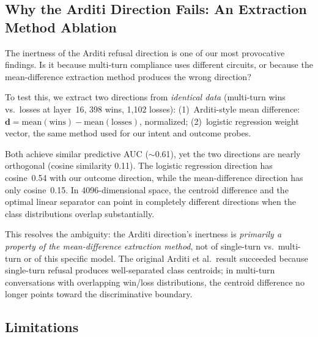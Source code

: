 \documentclass[11pt]{article}
\begin{document}
\subsection{Why the Arditi Direction Fails: An Extraction Method Ablation}
\label{sec:extraction}

The inertness of the Arditi refusal direction is one of our most provocative findings.
Is it because multi-turn compliance uses different circuits, or because the mean-difference extraction method produces the wrong direction?

To test this, we extract two directions from \emph{identical data} (multi-turn wins vs.\ losses at layer~16, 398 wins, 1{,}102 losses):
(1)~Arditi-style mean difference: $\mathbf{d} = \text{mean}(\text{wins}) - \text{mean}(\text{losses})$, normalized;
(2)~logistic regression weight vector, the same method used for our intent and outcome probes.

Both achieve similar predictive AUC ($\sim$0.61), yet the two directions are nearly orthogonal (cosine similarity 0.11).
The logistic regression direction has cosine~0.54 with our outcome direction, while the mean-difference direction has only cosine~0.15.
In 4096-dimensional space, the centroid difference and the optimal linear separator can point in completely different directions when the class distributions overlap substantially.

This resolves the ambiguity: the Arditi direction's inertness is \emph{primarily a property of the mean-difference extraction method}, not of single-turn vs.\ multi-turn or of this specific model.
The original Arditi et al.\ result \citep{arditi2024refusal} succeeded because single-turn refusal produces well-separated class centroids; in multi-turn conversations with overlapping win/loss distributions, the centroid difference no longer points toward the discriminative boundary.

\subsection{Limitations}
\end{document}
